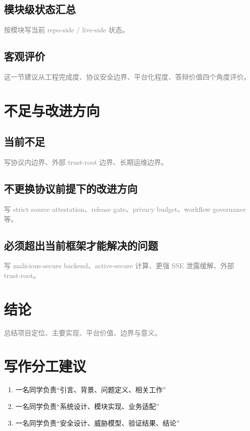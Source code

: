\documentclass[UTF8,a4paper,12pt,oneside]{ctexrep}
\newcommand{\placeholder}[1]{\textcolor{gray}{#1}}
\begin{document}
\section{模块级状态汇总}
\placeholder{按模块写当前 repo-side / live-side 状态。}

\section{客观评价}
\placeholder{这一节建议从工程完成度、协议安全边界、平台化程度、答辩价值四个角度评价。}

\chapter{不足与改进方向}

\section{当前不足}
\placeholder{写协议内边界、外部 trust-root 边界、长期运维边界。}

\section{不更换协议前提下的改进方向}
\placeholder{写 strict source attestation、release gate、privacy budget、workflow governance 等。}

\section{必须超出当前框架才能解决的问题}
\placeholder{写 malicious-secure backend、active-secure 计算、更强 SSE 泄露缓解、外部 trust-root。}

\chapter{结论}
\placeholder{总结项目定位、主要实现、平台价值、边界与意义。}

\appendix

\chapter{写作分工建议}

\begin{enumerate}
  \item 一名同学负责“引言、背景、问题定义、相关工作”
  \item 一名同学负责“系统设计、模块实现、业务适配”
  \item 一名同学负责“安全设计、威胁模型、验证结果、结论”
\end{enumerate}
\end{document}
